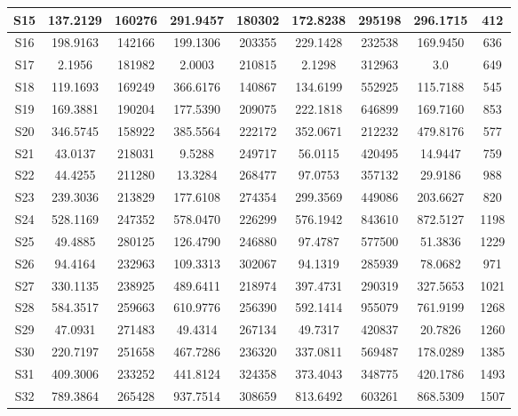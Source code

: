 \begin{table}
\begin{center}
{\begin{tabular}{|c|c|c|c|c|c|c|c|c|}
				S15	&  137.2129 & 160276 &  291.9457 & 180302 &  172.8238 & 295198 &  296.1715 &  412  \\ \hline
				S16	&  198.9163 & 142166 &  199.1306 & 203355 &  229.1428 & 232538 &  169.9450 &  636  \\ \hline
				S17	&  2.1956   & 181982 &  2.0003   & 210815 &  2.1298   & 312963 &  3.0      &  649  \\ \hline
				S18	&  119.1693 & 169249 &  366.6176 & 140867 &  134.6199 & 552925 &  115.7188 &  545  \\ \hline
				S19	&  169.3881 & 190204 &  177.5390 & 209075 &  222.1818 & 646899 &  169.7160 &  853  \\ \hline
				S20	&  346.5745 & 158922 &  385.5564 & 222172 &  352.0671 & 212232 &  479.8176 &  577  \\ \hline
				S21	&  43.0137  & 218031 &  9.5288   & 249717 &  56.0115  & 420495 &  14.9447  &  759  \\ \hline
				S22	&  44.4255  & 211280 &  13.3284  & 268477 &  97.0753  & 357132 &  29.9186  &  988  \\ \hline
				S23	&  239.3036 & 213829 &  177.6108 & 274354 &  299.3569 & 449086 &  203.6627 &  820  \\ \hline
				S24	&  528.1169 & 247352 &  578.0470 & 226299 &  576.1942 & 843610 &  872.5127 &  1198 \\ \hline
				S25	&  49.4885  & 280125 &  126.4790 & 246880 &  97.4787  & 577500 &  51.3836  &  1229 \\ \hline
				S26	&  94.4164  & 232963 &  109.3313 & 302067 &  94.1319  & 285939 &  78.0682  &  971  \\ \hline
				S27	&  330.1135 & 238925 &  489.6411 & 218974 &  397.4731 & 290319 &  327.5653 &  1021 \\ \hline
				S28	&  584.3517 & 259663 &  610.9776 & 256390 &  592.1414 & 955079 &  761.9199 &  1268 \\ \hline
				S29	&  47.0931  & 271483 &  49.4314  & 267134 &  49.7317  & 420837 &  20.7826  &  1260 \\ \hline
				S30	&  220.7197 & 251658 &  467.7286 & 236320 &  337.0811 & 569487 &  178.0289 &  1385 \\ \hline
				S31	&  409.3006 & 233252 &  441.8124 & 324358 &  373.4043 & 348775 &  420.1786 &  1493 \\ \hline
				S32	&  789.3864 & 265428 &  937.7514 & 308659 &  813.6492 & 603261 &  868.5309 &  1507 \\ \hline
		\end{tabular}}
	\end{center}
\end{table}


